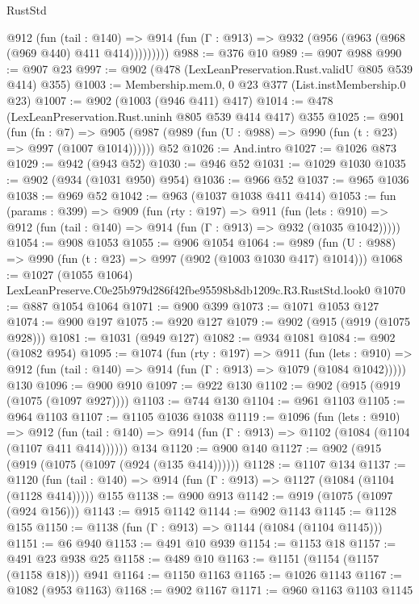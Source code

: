 \begin{lexlean}{RustStd}
\begin{coremodule}
          @912
            (fun (tail : @140) =>
            @914 (fun (Γ : @913) => @932 (@956 (@963 (@968 (@969 @440) @411 @414)))))))))
@988 := @376 @10
@989 := @907 @988
@990 := @907 @23
@997 := @902 (@478 (LexLeanPreservation.Rust.validU @805 @539 @414) @355)
@1003 := Membership.mem.{0, 0} @23 @377 (List.instMembership.{0} @23)
@1007 := @902 (@1003 (@946 @411) @417)
@1014 := @478 (LexLeanPreservation.Rust.uninh @805 @539 @414 @417) @355
@1025 := @901
    (fun (fn : @7) =>
    @905 (@987 (@989 (fun (U : @988) => @990 (fun (t : @23) => @997 (@1007 @1014))))))
    @52
@1026 := And.intro
@1027 := @1026 @873
@1029 := @942 (@943 @52)
@1030 := @946 @52
@1031 := @1029 @1030
@1035 := @902 (@934 (@1031 @950) @954)
@1036 := @966 @52
@1037 := @965 @1036
@1038 := @969 @52
@1042 := @963 (@1037 @1038 @411 @414)
@1053 := fun (params : @399) =>
  @909
    (fun (rty : @197) =>
    @911
      (fun (lets : @910) =>
      @912 (fun (tail : @140) => @914 (fun (Γ : @913) => @932 (@1035 @1042)))))
@1054 := @908 @1053
@1055 := @906 @1054
@1064 := @989 (fun (U : @988) => @990 (fun (t : @23) => @997 (@902 (@1003 @1030 @417) @1014)))
@1068 := @1027 (@1055 @1064) LexLeanPreserve.C0e25b979d286f42fbe95598b8db1209c.R3.RustStd.look0
@1070 := @887 @1054 @1064
@1071 := @900 @399
@1073 := @1071 @1053 @127
@1074 := @900 @197
@1075 := @920 @127
@1079 := @902 (@915 (@919 (@1075 @928)))
@1081 := @1031 (@949 @127)
@1082 := @934 @1081
@1084 := @902 (@1082 @954)
@1095 := @1074
    (fun (rty : @197) =>
    @911
      (fun (lets : @910) =>
      @912 (fun (tail : @140) => @914 (fun (Γ : @913) => @1079 (@1084 @1042)))))
    @130
@1096 := @900 @910
@1097 := @922 @130
@1102 := @902 (@915 (@919 (@1075 (@1097 @927))))
@1103 := @744 @130
@1104 := @961 @1103
@1105 := @964 @1103
@1107 := @1105 @1036 @1038
@1119 := @1096
    (fun (lets : @910) =>
    @912 (fun (tail : @140) => @914 (fun (Γ : @913) => @1102 (@1084 (@1104 (@1107 @411 @414))))))
    @134
@1120 := @900 @140
@1127 := @902 (@915 (@919 (@1075 (@1097 (@924 (@135 @414))))))
@1128 := @1107 @134
@1137 := @1120
    (fun (tail : @140) => @914 (fun (Γ : @913) => @1127 (@1084 (@1104 (@1128 @414)))))
    @155
@1138 := @900 @913
@1142 := @919 (@1075 (@1097 (@924 @156)))
@1143 := @915 @1142
@1144 := @902 @1143
@1145 := @1128 @155
@1150 := @1138 (fun (Γ : @913) => @1144 (@1084 (@1104 @1145)))
@1151 := @6 @940
@1153 := @491 @10 @939
@1154 := @1153 @18
@1157 := @491 @23 @938 @25
@1158 := @489 @10
@1163 := @1151 (@1154 (@1157 (@1158 @18))) @941
@1164 := @1150 @1163
@1165 := @1026 @1143
@1167 := @1082 (@953 @1163)
@1168 := @902 @1167
@1171 := @960 @1163 @1103 @1145

\end{coremodule}
\end{lexlean}
